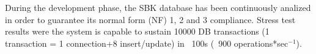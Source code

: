 \documentclass[a4paper]{jpconf}
\begin{document}

During the development phase, the SBK database has been continuously analized in order to guarantee its normal form (NF) 1, 2 and 3 compliance.
Stress test results were the system is capable to sustain 10000 DB transactions (1 transaction = 1 connection+8 insert/update) in ~100s (~900 operations*sec$^{-1}$).
\end{document}
